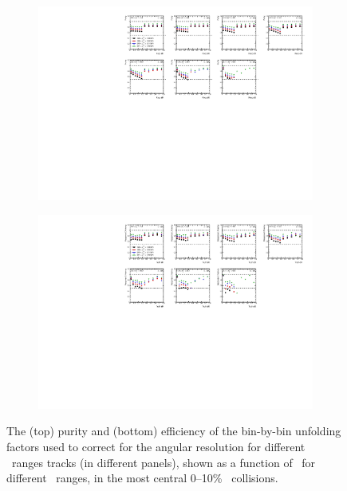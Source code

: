 \begin{figure}
\centering
\begin{subfigure}{1.\textwidth}
\centering \includegraphics[page=1, width=1\textwidth]{figures/main/corrections/RespPurity_PbPb}
\caption{}
\label{fig:RespPurity_PbPb}
\end{subfigure}
\begin{subfigure}{1.\textwidth}
\centering \includegraphics[page=1, width=1\textwidth]{figures/main/corrections/RespEfficiency_PbPb}
\caption{}
\label{fig:RespEfficiency_PbPb}
\end{subfigure}
\caption{The (top) purity and (bottom) efficiency of the bin-by-bin unfolding factors used to correct for the angular resolution for different \pttrk\ ranges tracks (in different panels), shown as a function of \rvar\ for different \ptjet\ ranges, in the most central 0--10\% \pbpb\ collisions.}
\label{fig:RespEfficiencyPurity}
\end{figure}


